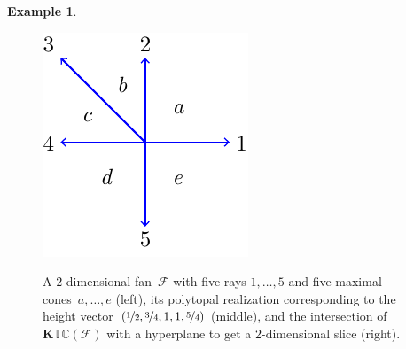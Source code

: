 \documentclass{amsart}
\theoremstyle{definition}
\newtheorem{example}[theorem]{Example}
\renewcommand{\b}[1]{{\boldsymbol{#1}}} %
\newcommand{\Fan}{\mathcal{F}} %
\newcommand{\typeCone}{\mathbb{TC}} %
\begin{document}
\begin{example}
\begin{figure}[htpb]
	\capstart
	\centerline{{\includegraphics[scale=1]{typeConeFan}}  \quad {}}
	\caption{A $2$-dimensional fan~$\Fan$ with five rays $1, \dots, 5$ and five maximal cones~$a, \dots, e$ (left), its polytopal realization corresponding to the height vector~$(\nicefrac{1}{2}, \nicefrac{3}{4}, 1, 1, \nicefrac{5}{4})$ (middle), and the intersection of $\b{K}\typeCone(\Fan)$ with a hyperplane to get a $2$-dimensional slice (right).}
	\label{fig:typeCone}
\end{figure}
\end{example}
\end{document}
